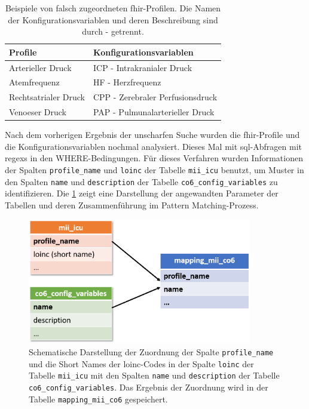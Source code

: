 \begin{table}[ht]
	\centering 
	\caption[Beispiele von falsch zugeordneten \acs{fhir}-Profilen]{Beispiele von falsch zugeordneten \acs{fhir}-Profilen. Die Namen der Konfigurationsvariablen und deren Beschreibung sind durch \glqq-\grqq{} getrennt.}
	\label{tab:wrongpaar}
	\begin{tabular}{|l|l|}
		\hline
		\bfseries Profile & \bfseries Konfigurationsvariablen \\ \hline
		Arterieller Druck & ICP - Intrakranialer Druck \\ \hline
		Atemfrequenz & HF - Herzfrequenz \\ \hline
        Rechtsatrialer Druck & CPP - Zerebraler Perfusionsdruck \\ \hline
        Venoeser Druck & PAP - Pulmunalarterieller Druck \\ \hline
	\end{tabular}
\end{table}

Nach dem vorherigen Ergebnis der unscharfen Suche wurden die \ac{fhir}-Profile und die Konfigurationsvariablen nochmal analysiert. Dieses Mal mit \ac{sql}-Abfragen mit \acp{regex} in den WHERE-Bedingungen. Für dieses Verfahren wurden Informationen der Spalten \texttt{profile\_name} und \texttt{loinc} der Tabelle \texttt{mii\_icu} benutzt, um Muster in den Spalten \texttt{name} und \texttt{description} der Tabelle \texttt{co6\_config\_variables} zu identifizieren. Die \ref{fig:mapping} zeigt eine Darstellung der angewandten Parameter der Tabellen und deren Zusammenführung im Pattern Matching-Prozess.


\begin{figure}[ht]
	\centering
	\includegraphics[height=5.5cm]{figures/mapping}
	\caption[Zuordnung der Konfigurationsvariablen mit den \acs{fhir}-Profilen]{Schematische Darstellung der Zuordnung der Spalte \texttt{profile\_name} und die \glqq Short Names\grqq{} der \acs{loinc}-Codes in der Spalte \texttt{loinc} der Tabelle \texttt{mii\_icu} mit den Spalten \texttt{name} und \texttt{description} der Tabelle \texttt{co6\_config\_variables}. Das Ergebnis der Zuordnung wird in der Tabelle \texttt{mapping\_mii\_co6} gespeichert.}
	\label{fig:mapping}
\end{figure}

